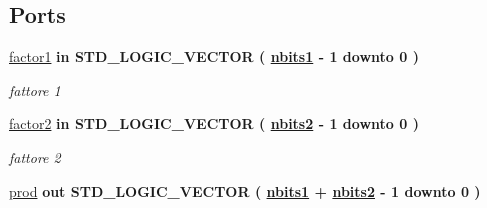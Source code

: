 \subsection*{Ports}
 \begin{DoxyCompactItemize}
\item 
\hyperlink{group___multiplier_gac728adecdbfe10213256c17c1b5c5128}{factor1}  {\bfseries {\bfseries \textcolor{vhdlchar}{in}\textcolor{vhdlchar}{ }}} {\bfseries \textcolor{vhdlchar}{S\+T\+D\+\_\+\+L\+O\+G\+I\+C\+\_\+\+V\+E\+C\+T\+O\+R}\textcolor{vhdlchar}{ }\textcolor{vhdlchar}{(}\textcolor{vhdlchar}{ }\textcolor{vhdlchar}{ }\textcolor{vhdlchar}{ }\textcolor{vhdlchar}{ }{\bfseries \hyperlink{group___multiplier_ga4ede473cdc13e75fe66fbd548b62e432}{nbits1}} \textcolor{vhdlchar}{-\/}\textcolor{vhdlchar}{ } \textcolor{vhdldigit}{1} \textcolor{vhdlchar}{ }\textcolor{vhdlchar}{downto}\textcolor{vhdlchar}{ }\textcolor{vhdlchar}{ } \textcolor{vhdldigit}{0} \textcolor{vhdlchar}{ }\textcolor{vhdlchar}{)}\textcolor{vhdlchar}{ }} 
\begin{DoxyCompactList}\small\item\em fattore 1 \end{DoxyCompactList}\item 
\hyperlink{group___multiplier_gac140852334303b430bbd49689cc689dd}{factor2}  {\bfseries {\bfseries \textcolor{vhdlchar}{in}\textcolor{vhdlchar}{ }}} {\bfseries \textcolor{vhdlchar}{S\+T\+D\+\_\+\+L\+O\+G\+I\+C\+\_\+\+V\+E\+C\+T\+O\+R}\textcolor{vhdlchar}{ }\textcolor{vhdlchar}{(}\textcolor{vhdlchar}{ }\textcolor{vhdlchar}{ }\textcolor{vhdlchar}{ }\textcolor{vhdlchar}{ }{\bfseries \hyperlink{group___multiplier_ga8b5bdaff4c3669528aaec95a07e17c2a}{nbits2}} \textcolor{vhdlchar}{-\/}\textcolor{vhdlchar}{ } \textcolor{vhdldigit}{1} \textcolor{vhdlchar}{ }\textcolor{vhdlchar}{downto}\textcolor{vhdlchar}{ }\textcolor{vhdlchar}{ } \textcolor{vhdldigit}{0} \textcolor{vhdlchar}{ }\textcolor{vhdlchar}{)}\textcolor{vhdlchar}{ }} 
\begin{DoxyCompactList}\small\item\em fattore 2 \end{DoxyCompactList}\item 
\hyperlink{group___multiplier_gaf168dc69ad77dc5791b5e0f99dcfb0a9}{prod}  {\bfseries {\bfseries \textcolor{vhdlchar}{out}\textcolor{vhdlchar}{ }}} {\bfseries \textcolor{vhdlchar}{S\+T\+D\+\_\+\+L\+O\+G\+I\+C\+\_\+\+V\+E\+C\+T\+O\+R}\textcolor{vhdlchar}{ }\textcolor{vhdlchar}{(}\textcolor{vhdlchar}{ }\textcolor{vhdlchar}{ }\textcolor{vhdlchar}{ }\textcolor{vhdlchar}{ }{\bfseries \hyperlink{group___multiplier_ga4ede473cdc13e75fe66fbd548b62e432}{nbits1}} \textcolor{vhdlchar}{+}\textcolor{vhdlchar}{ }\textcolor{vhdlchar}{ }\textcolor{vhdlchar}{ }{\bfseries \hyperlink{group___multiplier_ga8b5bdaff4c3669528aaec95a07e17c2a}{nbits2}} \textcolor{vhdlchar}{-\/}\textcolor{vhdlchar}{ } \textcolor{vhdldigit}{1} \textcolor{vhdlchar}{ }\textcolor{vhdlchar}{downto}\textcolor{vhdlchar}{ }\textcolor{vhdlchar}{ } \textcolor{vhdldigit}{0} \textcolor{vhdlchar}{ }\textcolor{vhdlchar}{)}\textcolor{vhdlchar}{ }} 

\end{DoxyCompactItemize}
